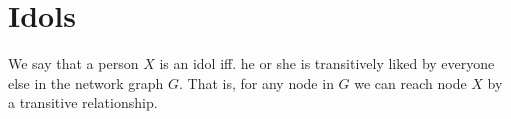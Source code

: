 %
%

\section{Idols}
We say that a person $X$ is an idol iff. he or she is transitively liked by
everyone else in the network graph $G$. That is, for any node in $G$ we can
reach node $X$ by a transitive relationship.

